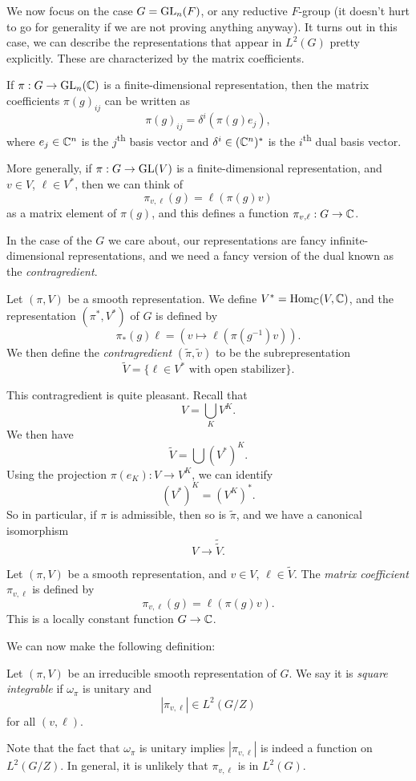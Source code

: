 \documentclass[a4paper]{article}
\begin{document}
We now focus on the case $G = \mathrm{GL}_n(F)$, or any reductive $F$-group (it doesn't hurt to go for generality if we are not proving anything anyway). It turns out in this case, we can describe the representations that appear in $L^2(G)$ pretty explicitly. These are characterized by the matrix coefficients.

If $\pi: G \to \mathrm{GL}_n(\mathbb{C})$ is a finite-dimensional representation, then the matrix coefficients $\pi(g)_{ij}$ can be written as
\[
  \pi(g)_{ij} = \delta^i(\pi(g) e_j),
\]
where $e_j \in \mathbb{C}^n$ is the $j$\textsuperscript{th} basis vector and $\delta^i \in (\mathbb{C}^n)^*$ is the $i$\textsuperscript{th} dual basis vector.

More generally, if $\pi: G \to \mathrm{GL}(V)$ is a finite-dimensional representation, and $v \in V$, $\ell \in V^*$, then we can think of
\[
  \pi_{v, \ell}(g) = \ell(\pi(g)v)
\]
as a matrix element of $\pi(g)$, and this defines a function $\pi_{v, \ell}: G \to \mathbb{C}$.

In the case of the $G$ we care about, our representations are fancy infinite-dimensional representations, and we need a fancy version of the dual known as the \emph{contragredient}.
\begin{defi}[Contragredient]
  Let $(\pi, V)$ be a smooth representation. We define $V^* = \operatorname{Hom}_{\mathbb{C}}(V, \mathbb{C})$, and the representation $(\pi^*, V^*)$ of $G$ is defined by
  \[
    \pi_*(g)\ell = (v \mapsto \ell(\pi(g^{-1})v)).
  \]
  We then define the \emph{contragredient} $(\tilde{\pi}, \tilde{v})$ to be the subrepresentation
  \[
    \tilde{V} = \{\ell \in V^* \text{ with open stabilizer}\}.
  \]
\end{defi}
This contragredient is quite pleasant. Recall that
\[
  V = \bigcup_K V^K.
\]
We then have
\[
  \tilde{V} = \bigcup (V^*)^K.
\]
Using the projection $\pi(e_K): V \to V^K$, we can identify
\[
  (V^*)^K = (V^K)^*.
\]
So in particular, if $\pi$ is admissible, then so is $\tilde{\pi}$, and we have a canonical isomorphism
\[
  V \to \tilde{\tilde{V}}.
\]

\begin{defi}
  Let $(\pi, V)$ be a smooth representation, and $v \in V$, $\ell \in \tilde{V}$. The \emph{matrix coefficient} $\pi_{v, \ell}$ is defined by
  \[
    \pi_{v, \ell}(g) = \ell(\pi(g) v).
  \]
  This is a locally constant function $G \to \mathbb{C}$.
\end{defi}

We can now make the following definition:
\begin{defi} 
  Let $(\pi, V)$ be an irreducible smooth representation of $G$. We say it is \emph{square integrable} if $\omega_\pi$ is unitary and
  \[
    |\pi_{v, \ell}| \in L^2(G/Z)
  \]
  for all $(v, \ell)$.
\end{defi}
Note that the fact that $\omega_{\pi}$ is unitary implies $|\pi_{v, \ell}|$ is indeed a function on $L^2(G/Z)$. In general, it is unlikely that $\pi_{v, \ell}$ is in $L^2(G)$.
\end{document}
